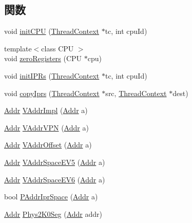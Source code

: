 \subsection*{関数}
\begin{DoxyCompactItemize}
\item 
void \hyperlink{namespaceAlphaISA_aded557a1e716c6f849b0e0b05fc77676}{initCPU} (\hyperlink{classThreadContext}{ThreadContext} $\ast$tc, int cpuId)
\item 
{\footnotesize template$<$class CPU $>$ }\\void \hyperlink{namespaceAlphaISA_ac1e586c013057b642701d473139aa444}{zeroRegisters} (CPU $\ast$cpu)
\item 
void \hyperlink{namespaceAlphaISA_a69ad890f318cd923f9a65897a06cbf50}{initIPRs} (\hyperlink{classThreadContext}{ThreadContext} $\ast$tc, int cpuId)
\item 
void \hyperlink{namespaceAlphaISA_a42c226b069903e985920fe085c8d7a81}{copyIprs} (\hyperlink{classThreadContext}{ThreadContext} $\ast$src, \hyperlink{classThreadContext}{ThreadContext} $\ast$dest)
\item 
\hyperlink{classm5_1_1params_1_1Addr}{Addr} \hyperlink{namespaceAlphaISA_a06a35d8f74d0d30584c5962c5b15e4bd}{VAddrImpl} (\hyperlink{classm5_1_1params_1_1Addr}{Addr} a)
\item 
\hyperlink{classm5_1_1params_1_1Addr}{Addr} \hyperlink{namespaceAlphaISA_a6ffa81e21e2eb5e447ece4abf6a70d78}{VAddrVPN} (\hyperlink{classm5_1_1params_1_1Addr}{Addr} a)
\item 
\hyperlink{classm5_1_1params_1_1Addr}{Addr} \hyperlink{namespaceAlphaISA_a8ef9303074541727ee9a1fdb7fa29c69}{VAddrOffset} (\hyperlink{classm5_1_1params_1_1Addr}{Addr} a)
\item 
\hyperlink{classm5_1_1params_1_1Addr}{Addr} \hyperlink{namespaceAlphaISA_ac33810d23de17bbfa808c6b9e4e35887}{VAddrSpaceEV5} (\hyperlink{classm5_1_1params_1_1Addr}{Addr} a)
\item 
\hyperlink{classm5_1_1params_1_1Addr}{Addr} \hyperlink{namespaceAlphaISA_a9959ff43372ace452f37b2e12552484d}{VAddrSpaceEV6} (\hyperlink{classm5_1_1params_1_1Addr}{Addr} a)
\item 
bool \hyperlink{namespaceAlphaISA_a85201164b9da471550f01069be9d1e7d}{PAddrIprSpace} (\hyperlink{classm5_1_1params_1_1Addr}{Addr} a)
\item 
\hyperlink{classm5_1_1params_1_1Addr}{Addr} \hyperlink{namespaceAlphaISA_a1305e32166e725ed6b030319f1ce8681}{Phys2K0Seg} (\hyperlink{classm5_1_1params_1_1Addr}{Addr} addr)
\item 

\end{DoxyCompactItemize}

